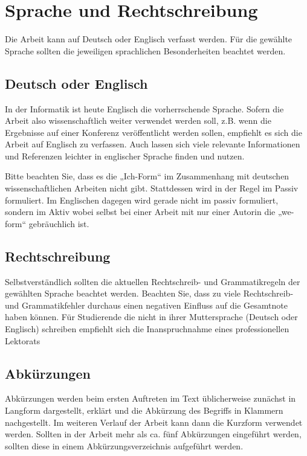 \section{Sprache und Rechtschreibung}\label{sec:sprache-und-rechtschreibung}
%
Die Arbeit kann auf Deutsch oder Englisch verfasst werden. Für die gewählte Sprache sollten die jeweiligen sprachlichen Besonderheiten beachtet werden.

\subsection{Deutsch oder Englisch}\label{ssec:deutsch-oder-englisch}
%
In der Informatik ist heute Englisch die vorherrschende Sprache. Sofern die Arbeit also wissenschaftlich weiter verwendet werden soll, z.B. wenn die Ergebnisse auf einer Konferenz veröffentlicht werden sollen, empfiehlt es sich die Arbeit auf Englisch zu verfassen. Auch lassen sich viele relevante Informationen und Referenzen leichter in englischer Sprache finden und nutzen.

Bitte beachten Sie, dass es die „Ich-Form“ im Zusammenhang mit deutschen wissenschaftlichen Arbeiten nicht gibt. Stattdessen wird in der Regel im Passiv formuliert. Im Englischen dagegen wird gerade nicht im passiv formuliert, sondern im Aktiv wobei selbst bei einer Arbeit mit nur einer Autorin die „we-form“ gebräuchlich ist.

\subsection{Rechtschreibung}\label{ssec:rechtschreibung}
%
Selbstverständlich sollten die aktuellen Rechtschreib- und Grammatikregeln der gewählten Sprache beachtet werden. Beachten Sie, dass zu viele Rechtschreib- und Grammatikfehler durchaus einen negativen Einfluss auf die Gesamtnote haben können. Für Studierende die nicht in ihrer Muttersprache (Deutsch oder Englisch) schreiben empfiehlt sich die Inanspruchnahme eines professionellen Lektorats

\subsection{Abkürzungen}\label{ssec:abkurzungen}
%
Abkürzungen werden beim ersten Auftreten im Text üblicherweise zunächst in Langform dargestellt, erklärt und die Abkürzung des Begriffs in Klammern nachgestellt. Im weiteren Verlauf der Arbeit kann dann die Kurzform verwendet werden. Sollten in der Arbeit mehr als ca. fünf Abkürzungen eingeführt werden, sollten diese in einem Abkürzungsverzeichnis aufgeführt werden.
\medskip

